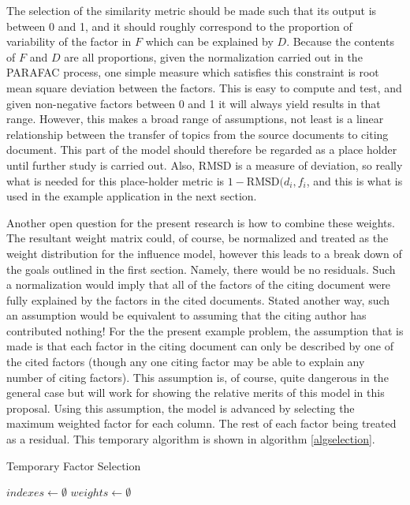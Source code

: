 \documentclass{article}
\begin{document}
The selection of the similarity metric should be made such that its
output is between 0 and 1, and it should roughly correspond to the
proportion of variability of the factor in $F$ which can be explained
by $D$.  Because the contents of $F$ and $D$ are all proportions,
given the normalization carried out in the PARAFAC process, one simple
measure which satisfies this constraint is root mean square deviation
between the factors.  This is easy to compute and test, and given
non-negative factors between 0 and 1 it will always yield results in
that range.  However, this makes a broad range of assumptions, not
least is a linear relationship between the transfer of topics from the
source documents to citing document.  This part of the model should
therefore be regarded as a place holder until further study is carried
out.  Also, RMSD is a measure of deviation, so really what is needed
for this place-holder metric is $1-\mathrm{RMSD}(d_i, f_i$, and this
is what is used in the example application in the next section.

Another open question for the present research is how to combine these
weights.  The resultant weight matrix could, of course, be normalized
and treated as the weight distribution for the influence model,
however this leads to a break down of the goals outlined in the first
section.  Namely, there would be no residuals.  Such a normalization
would imply that all of the factors of the citing document were fully
explained by the factors in the cited documents.  Stated another way,
such an assumption would be equivalent to assuming that the citing
author has contributed nothing!  For the the present example problem,
the assumption that is made is that each factor in the citing document
can only be described by one of the cited factors (though any one
citing factor may be able to explain any number of citing factors).
This assumption is, of course, quite dangerous in the general case but
will work for showing the relative merits of this model in this
proposal.  Using this assumption, the model is advanced by selecting
the maximum weighted factor for each column.  The rest of each factor
being treated as a residual.  This temporary algorithm is shown in
algorithm \ref{algselection}.

\begin{algorithm}
    \caption{Temporary Factor Selection}
    \label{algselection}
    $indexes \leftarrow \emptyset$\;
    $weights \leftarrow \emptyset$\;
\end{algorithm}
\end{document}
